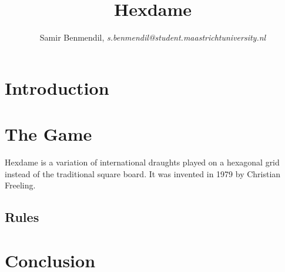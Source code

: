 \documentclass[a4paper,10pt]{article}
\title{Hexdame}
\author{Samir Benmendil, \textit{s.benmendil@student.maastrichtuniversity.nl}}
\begin{document}
\maketitle

\begin{abstract}

\end{abstract}

\section{Introduction}
\section{The Game} %
Hexdame is a variation of international draughts played on a hexagonal grid instead of the traditional square board. It was invented in 1979 by Christian Freeling. \cite{Freeling2013}

\subsection{Rules}


\section{Conclusion}



\end{document}
